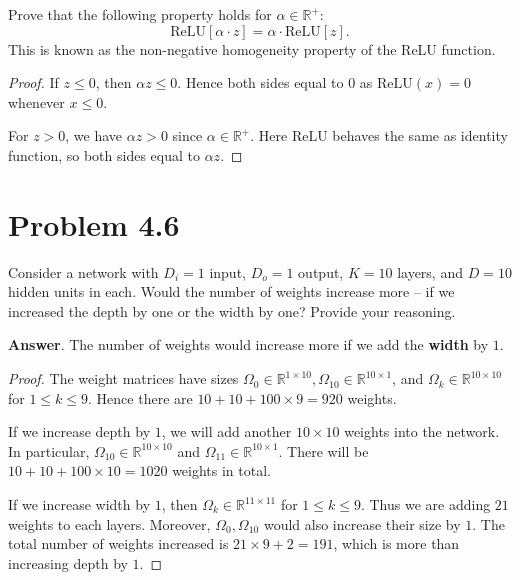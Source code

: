\documentclass[10pt]{article}
\newcommand{\RR}{\mathbb{R}}
\begin{document}
Prove that the following property holds for $\alpha \in \mathbb{R}^+$:
\[
\text{ReLU}[\alpha \cdot z] = \alpha \cdot \text{ReLU}[z].
\]
This is known as the non-negative homogeneity property of the ReLU function.

\begin{proof}
    If \(z \leq 0\), then \(\alpha z \leq 0\). Hence both sides equal to \(0\) as \(\mathrm{ReLU}(x) = 0\) whenever \(x \leq 0\). 

    For \(z>0\), we have \(\alpha z > 0\) since \(\alpha \in \RR^+\). Here \(\mathrm{ReLU}\) behaves the same as identity function, so both sides equal to \(\alpha z\). 
\end{proof}

\vspace{2em}

\section*{Problem 4.6}

Consider a network with $D_i = 1$ input, $D_o = 1$ output, $K = 10$ layers, and $D = 10$ hidden units in each. Would the number of weights increase more -- if we increased the depth by one or the width by one? Provide your reasoning.

\noindent
\textbf{Answer}. The number of weights would increase more if we add the \textbf{width} by $1$. 
\begin{proof}
    The weight matrices have sizes \(\Omega_0 \in \RR^{1 \times 10}, \Omega_{10} \in \RR^{10 \times 1}\), and \(\Omega_k \in \RR^{10 \times 10}\) for \(1 \leq k \leq 9\). Hence there are \(10+10+100 \times 9 = 920\) weights. 

    If we increase depth by $1$, we will add another \(10 \times 10\) weights into the network. In particular, \(\Omega_{10} \in \RR^{10 \times 10}\) and \(\Omega_{11} \in \RR^{10 \times 1}\). There will be \(10+10+100 \times 10 = 1020\) weights in total. 

    If we increase width by $1$, then \(\Omega_k \in \RR^{11 \times 11}\) for \(1 \leq k \leq 9\). Thus we are adding \(21\) weights to each layers. Moreover, \(\Omega_0, \Omega_{10}\) would also increase their size by \(1\). The total number of weights increased is \(21 \times 9 + 2 = 191\), which is more than increasing depth by \(1\). 
\end{proof}
\end{document}
